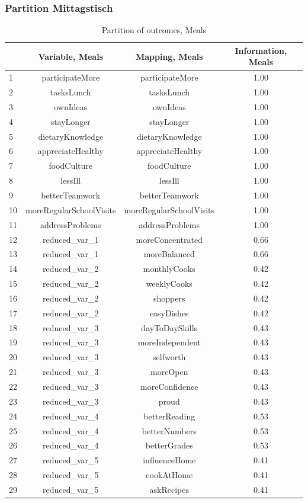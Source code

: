 \begin{frame}[fragile]
\frametitle{Partition Mittagstisch}
\begin{table}[ht]
\centering
\begin{tabular}{lccc}
  \hline
 & Variable, Meals & Mapping, Meals & Information, Meals \\ 
  \hline
1 & participateMore & participateMore & 1.00 \\ 
  2 & tasksLunch & tasksLunch & 1.00 \\ 
  3 & ownIdeas & ownIdeas & 1.00 \\ 
  4 & stayLonger & stayLonger & 1.00 \\ 
  5 & dietaryKnowledge & dietaryKnowledge & 1.00 \\ 
  6 & appreciateHealthy & appreciateHealthy & 1.00 \\ 
  7 & foodCulture & foodCulture & 1.00 \\ 
  8 & lessIll & lessIll & 1.00 \\ 
  9 & betterTeamwork & betterTeamwork & 1.00 \\ 
  10 & moreRegularSchoolVisits & moreRegularSchoolVisits & 1.00 \\ 
  11 & addressProblems & addressProblems & 1.00 \\ 
  12 & reduced\_var\_1 & moreConcentrated & 0.66 \\ 
  13 & reduced\_var\_1 & moreBalanced & 0.66 \\ 
  14 & reduced\_var\_2 & monthlyCooks & 0.42 \\ 
  15 & reduced\_var\_2 & weeklyCooks & 0.42 \\ 
  16 & reduced\_var\_2 & shoppers & 0.42 \\ 
  17 & reduced\_var\_2 & easyDishes & 0.42 \\ 
  18 & reduced\_var\_3 & dayToDaySkills & 0.43 \\ 
  19 & reduced\_var\_3 & moreIndependent & 0.43 \\ 
  20 & reduced\_var\_3 & selfworth & 0.43 \\ 
  21 & reduced\_var\_3 & moreOpen & 0.43 \\ 
  22 & reduced\_var\_3 & moreConfidence & 0.43 \\ 
  23 & reduced\_var\_3 & proud & 0.43 \\ 
  24 & reduced\_var\_4 & betterReading & 0.53 \\ 
  25 & reduced\_var\_4 & betterNumbers & 0.53 \\ 
  26 & reduced\_var\_4 & betterGrades & 0.53 \\ 
  27 & reduced\_var\_5 & influenceHome & 0.41 \\ 
  28 & reduced\_var\_5 & cookAtHome & 0.41 \\ 
  29 & reduced\_var\_5 & askRecipes & 0.41 \\ 
   \hline
\end{tabular}
\caption{Partition of outcomes, Meals} 
\label{partitionmeals}
\end{table}


\end{frame}

